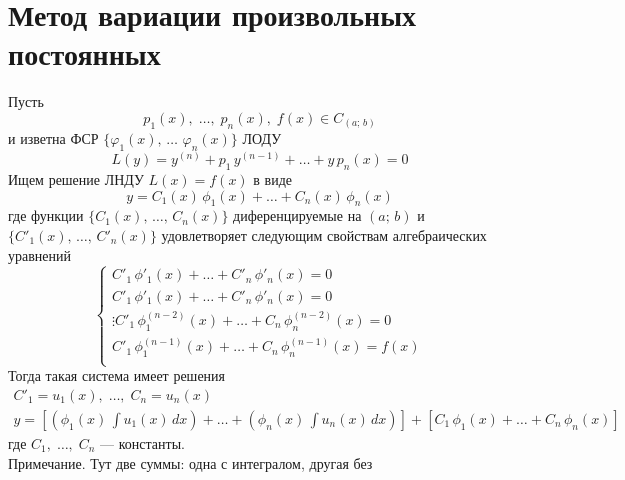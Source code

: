 \author{Tkachuk Andrei}

\section{Метод вариации произвольных постоянных}

\begin{Th}
    Пусть 
    \[
        p_1(x),\; \dots,\; p_n(x),\; f(x) \in C_{(a;\,b)}
    \]
    и изветна ФСР $\{\varphi_1(x),\, \dots\,\, \varphi_n(x)\}$ ЛОДУ
    \[
        L(y) = y^{(n)} + p_1\,y^{(n-1)} + \dots + y\,p_n(x) = 0
    \]
    Ищем решение ЛНДУ $L(x) = f(x)$ в виде 
    \[
        y = C_1(x)\,\phi_1(x) + \dots + C_n(x)\,\phi_n(x)
    \]
    где функции $\{C_1(x),\, \dots,\, C_n(x)\}$ диференцируемые на $(a;\, b)$
    и $\{C'_1(x),\, \dots,\, C'_n(x)\}$ удовлетворяет следующим свойствам алгебраических уравнений
    \[
        \begin{cases}
            C'_1\,\phi'_1(x) + \dots + C'_n\,\phi'_n(x) = 0\\
            C'_1\,\phi'_1(x) + \dots + C'_n\,\phi'_n(x) = 0\\
            \vdots
            C'_1\,\phi^{(n-2)}_1(x) + \dots + C_n\,\phi^{(n-2)}_n(x) = 0\\
            C'_1\,\phi^{(n-1)}_1(x) + \dots + C_n\,\phi^{(n-1)}_n(x) = f(x)\\
        \end{cases}
    \]
    Тогда такая система имеет решения
    \begin{gather*}
        C'_1 = u_1(x),\; \dots,\; C_n = u_n(x)\\
        y = \left[\left(\phi_1(x)\, \int u_1(x)\,dx \right) + \dots + \left( \phi_n(x)\, \int u_n(x)\,dx \right) \right] + \left[C_1\,\phi_1(x) + \dots + C_n\,\phi_n(x)\right]
    \end{gather*}
    где $C_1,\; \dots,\; C_n$ --- константы.\\
    Примечание. Тут две суммы: одна с интегралом, другая без
\end{Th}

